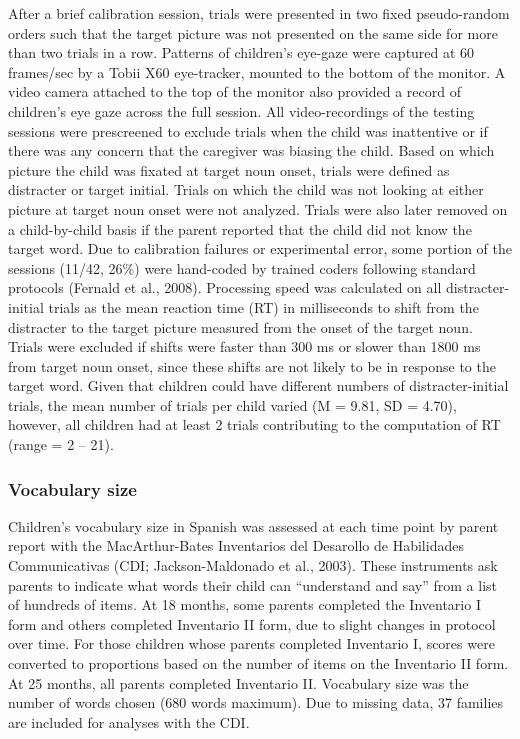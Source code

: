 \documentclass[
  english,
  man,floatsintext]{apa6}
\begin{document}
After a brief calibration session, trials were presented in two fixed pseudo-random orders such that the target picture was not presented on the same side for more than two trials in a row. Patterns of children's eye-gaze were captured at 60 frames/sec by a Tobii X60 eye-tracker, mounted to the bottom of the monitor. A video camera attached to the top of the monitor also provided a record of children's eye gaze across the full session. All video-recordings of the testing sessions were prescreened to exclude trials when the child was inattentive or if there was any concern that the caregiver was biasing the child. Based on which picture the child was fixated at target noun onset, trials were defined as distracter or target initial. Trials on which the child was not looking at either picture at target noun onset were not analyzed. Trials were also later removed on a child-by-child basis if the parent reported that the child did not know the target word. Due to calibration failures or experimental error, some portion of the sessions (11/42, 26\%) were hand-coded by trained coders following standard protocols (Fernald et al., 2008). Processing speed was calculated on all distracter-initial trials as the mean reaction time (RT) in milliseconds to shift from the distracter to the target picture measured from the onset of the target noun. Trials were excluded if shifts were faster than 300 ms or slower than 1800 ms from target noun onset, since these shifts are not likely to be in response to the target word. Given that children could have different numbers of distracter-initial trials, the mean number of trials per child varied (M = 9.81, SD = 4.70), however, all children had at least 2 trials contributing to the computation of RT (range = 2 -- 21).

\hypertarget{vocabulary-size}{%
\subsubsection{Vocabulary size}\label{vocabulary-size}}

Children's vocabulary size in Spanish was assessed at each time point by parent report with the MacArthur-Bates Inventarios del Desarollo de Habilidades Communicativas (CDI; Jackson-Maldonado et al., 2003). These instruments ask parents to indicate what words their child can \enquote{understand and say} from a list of hundreds of items. At 18 months, some parents completed the Inventario I form and others completed Inventario II form, due to slight changes in protocol over time. For those children whose parents completed Inventario I, scores were converted to proportions based on the number of items on the Inventario II form. At 25 months, all parents completed Inventario II. Vocabulary size was the number of words chosen (680 words maximum). Due to missing data, 37 families are included for analyses with the CDI.
\end{document}
